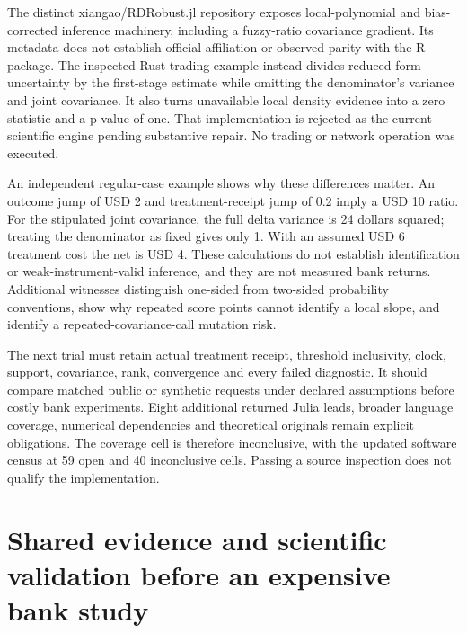 The distinct xiangao/RDRobust.jl repository exposes local-polynomial and
bias-corrected inference machinery, including a fuzzy-ratio covariance
gradient. Its metadata does not establish official affiliation or
observed parity with the R package. The inspected Rust trading example
instead divides reduced-form uncertainty by the first-stage estimate
while omitting the denominator's variance and joint covariance. It also
turns unavailable local density evidence into a zero statistic and a
p-value of one. That implementation is rejected as the current
scientific engine pending substantive repair. No trading or network
operation was executed.
\citep{exec23_otheriv_source_3,exec23_otheriv_source_4}

An independent regular-case example shows why these differences matter.
An outcome jump of USD 2 and treatment-receipt jump of 0.2 imply a USD
10 ratio. For the stipulated joint covariance, the full delta variance
is 24 dollars squared; treating the denominator as fixed gives only 1.
With an assumed USD 6 treatment cost the net is USD 4. These
calculations do not establish identification or weak-instrument-valid
inference, and they are not measured bank returns. Additional witnesses
distinguish one-sided from two-sided probability conventions, show why
repeated score points cannot identify a local slope, and identify a
repeated-covariance-call mutation risk. \citep{exec23_otheriv_reference}

The next trial must retain actual treatment receipt, threshold
inclusivity, clock, support, covariance, rank, convergence and every
failed diagnostic. It should compare matched public or synthetic
requests under declared assumptions before costly bank experiments.
Eight additional returned Julia leads, broader language coverage,
numerical dependencies and theoretical originals remain explicit
obligations. The coverage cell is therefore inconclusive, with the
updated software census at 59 open and 40 inconclusive cells. Passing a
source inspection does not qualify the implementation.
\citep{sp23otheriv_progress}

\hypertarget{shared-evidence-and-scientific-validation-before-an-expensive-bank-study}{%
\section{Shared evidence and scientific validation before an expensive
bank
study}\label{shared-evidence-and-scientific-validation-before-an-expensive-bank-study}}

